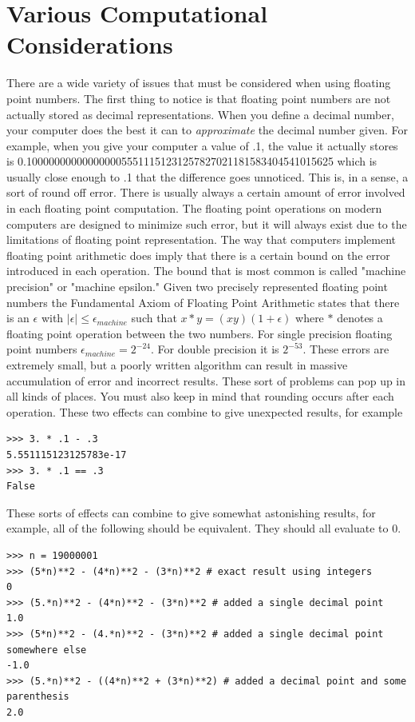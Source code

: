 \section*{Various Computational Considerations}

There are a wide variety of issues that must be considered when using floating point numbers.
The first thing to notice is that floating point numbers are not actually stored as decimal representations.
When you define a decimal number, your computer does the best it can to \emph{approximate} the decimal number given.
For example, when you give your computer a value of .1, the value it actually stores is 0.1000000000000000055511151231257827021181583404541015625 which is usually close enough to .1 that the difference goes unnoticed.
This is, in a sense, a sort of round off error.
There is usually always a certain amount of error involved in each floating point computation.
The floating point operations on modern computers are designed to minimize such error, but it will always exist due to the limitations of floating point representation.
The way that computers implement floating point arithmetic does imply that there is a certain bound on the error introduced in each operation.
The bound that is most common is called "machine precision" or "machine epsilon."
Given two precisely represented floating point numbers the Fundamental Axiom of Floating Point Arithmetic states that there is an $\epsilon$ with $|\epsilon | \leq \epsilon_{machine}$ such that $x * y = (x y) (1+\epsilon)$ where $*$ denotes a floating point operation between the two numbers.
For single precision floating point numbers $\epsilon_{machine} = 2^{-24}$.
For double precision it is $2^{-53}$.
These errors are extremely small, but a poorly written algorithm can result in massive accumulation of error and incorrect results.
These sort of problems can pop up in all kinds of places.
You must also keep in mind that rounding occurs after each operation.
These two effects can combine to give unexpected results, for example
\begin{lstlisting}
>>> 3. * .1 - .3
5.551115123125783e-17
>>> 3. * .1 == .3
False
\end{lstlisting}
These sorts of effects can combine to give somewhat astonishing results, for example, all of the following should be equivalent.
They should all evaluate to 0.
\begin{lstlisting}
>>> n = 19000001
>>> (5*n)**2 - (4*n)**2 - (3*n)**2 # exact result using integers
0
>>> (5.*n)**2 - (4*n)**2 - (3*n)**2 # added a single decimal point
1.0
>>> (5*n)**2 - (4.*n)**2 - (3*n)**2 # added a single decimal point somewhere else
-1.0
>>> (5.*n)**2 - ((4*n)**2 + (3*n)**2) # added a decimal point and some parenthesis
2.0
\end{lstlisting}
